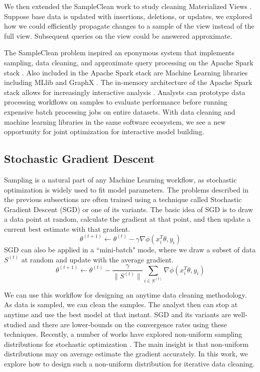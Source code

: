 We then extended the SampleClean work to study cleaning Materialized Views \cite{technicalReport}.
Suppose base data is updated with insertions, deletions, or updates, we explored how we could efficiently propagate
changes to a sample of the view instead of the full view.
Subsequent queries on the view could be answered approximate.

The SampleClean problem inspired an eponymous system that implements sampling, data cleaning, and approximate query processing on the Apache Spark stack \cite{sampleclean}.
Also included in the Apache Spark stack are Machine Learning libraries including MLlib \cite{mllib} and GraphX \cite{graphx}.
The in-memory architecture of the Apache Spark stack allows for increasingly interactive analysis \cite{AgarwalMPMMS13, armbrust2015spark}.
Analysts can prototype data processing workflows on samples to evaluate performance before running expensive batch processing jobs on entire datasets.
With data cleaning and machine learning libraries in the same software ecosystem, we see a new opportunity for joint optimization for interactive model building.



\subsection{Stochastic Gradient Descent}
Sampling is a natural part of any Machine Learning workflow, as stochastic optimization is widely used to fit model parameters.
The problems described in the previous subsections are often trained using a technique called Stochastic Gradient Descent (SGD) or one of its variants.
The basic idea of SGD is to draw a data point at random, calculate the gradient at that point, and then update a current best estimate with that gradient.
\[
\theta^{(t+1)}\leftarrow\theta^{(t)}-\gamma\nabla\phi(x_{i}^T\theta,y_{i})
\]
 SGD can also be applied in a ``mini-batch" mode, where we draw a subset of data $S^{(t)}$ at random and update with the average gradient.
 \[
 \theta^{(t+1)}\leftarrow\theta^{(t)}-\frac{\gamma}{\|S^{(t)}\|}\sum_{i\in S^{(t)}}\nabla\phi(x_{i}^T\theta,y_{i})
 \]

We can use this workflow for designing an anytime data cleaning methodology.
As data is sampled, we can clean the samples.
The analyst then can stop at anytime and use the best model at that instant.
SGD and its variants are well-studied and there are lower-bounds on the convergence rates using these techniques. 
Recently, a number of works have explored non-uniform sampling distributions for stochastic optimization \cite{zhao2014stochastic, qu2014randomized}.
The main insight is that non-uniform distributions may on average estimate the gradient accurately.
In this work, we explore how to design such a non-uniform distribution for iterative data cleaning.

\fi


 
